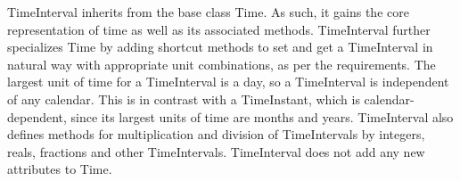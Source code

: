 
TimeInterval inherits from the base class Time.  As such, it gains the core
representation of time as well as its associated methods.   TimeInterval
further specializes Time by adding shortcut methods to set and get a
TimeInterval in natural way with appropriate unit combinations, as per the
requirements.  The largest unit of time for a TimeInterval is a day, so a
TimeInterval is independent of any calendar.  This is in contrast with a
TimeInstant, which is calendar-dependent, since its largest units of time
are months and years.  TimeInterval also defines methods for multiplication
and division of TimeIntervals by integers, reals, fractions and other
TimeIntervals.  TimeInterval does not add any new attributes to Time.

